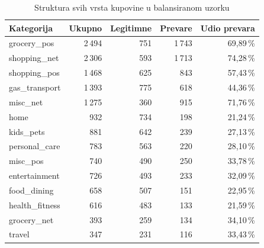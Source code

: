 \begin{table}[H]\centering\small
\caption{Struktura svih vrsta kupovine u balansiranom uzorku}
\begin{tabularx}{\linewidth}{@{}Yrrrr@{}}\toprule
Kategorija & Ukupno & Legitimne & Prevare & Udio prevara \\ \midrule
grocery\_pos & 2\,494 & 751 & 1\,743 & 69,89\,\% \\
shopping\_net & 2\,306 & 593 & 1\,713 & 74,28\,\% \\
shopping\_pos & 1\,468 & 625 & 843 & 57,43\,\% \\
gas\_transport & 1\,393 & 775 & 618 & 44,36\,\% \\
misc\_net & 1\,275 & 360 & 915 & 71,76\,\% \\
home & 932 & 734 & 198 & 21,24\,\% \\
kids\_pets & 881 & 642 & 239 & 27,13\,\% \\
personal\_care & 783 & 563 & 220 & 28,10\,\% \\
misc\_pos & 740 & 490 & 250 & 33,78\,\% \\
entertainment & 726 & 493 & 233 & 32,09\,\% \\
food\_dining & 658 & 507 & 151 & 22,95\,\% \\
health\_fitness & 616 & 483 & 133 & 21,59\,\% \\
grocery\_net & 393 & 259 & 134 & 34,10\,\% \\
travel & 347 & 231 & 116 & 33,43\,\% \\
\bottomrule\end{tabularx}\end{table}
